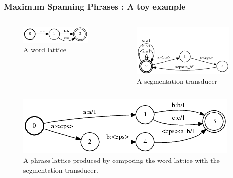 \documentclass{beamer}
\begin{document}
\begin{frame}
\frametitle{Maximum Spanning Phrases : A toy example}
\vspace{-6mm}

\begin{columns}[c] %

\begin{figure}
\includegraphics[width=0.5\linewidth]{l.png}
\caption{A word lattice.}
\end{figure}


\begin{figure}
\includegraphics[width=0.6\linewidth]{s.png}
\caption{A segmentation transducer}
\end{figure}

\end{columns}

\begin{figure}
\includegraphics[width=0.8\linewidth]{p.png}
\caption{A phrase lattice produced by composing the word lattice with the segmentation transducer.}
\end{figure}
\end{frame}

\end{document}

